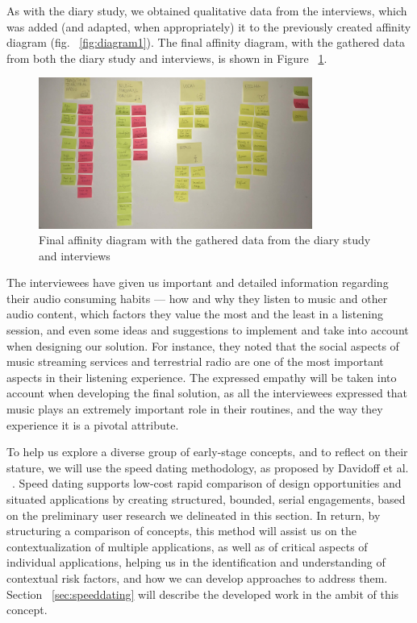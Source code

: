 As with the diary study, we obtained qualitative data from the interviews, which was added (and adapted, when appropriately) it to the previously created affinity diagram (fig. ~\ref{fig:diagram1}). The final affinity diagram, with the gathered data from both the diary study and interviews, is shown in Figure ~\ref{fig:diagram2}.

\begin{figure}[h]
\centering
\includegraphics[width=0.8\textwidth]{./Images/finalaffinitydiagram.jpg}
\caption{Final affinity diagram with the gathered data from the diary study and interviews}
\label{fig:diagram2}
\end{figure}

The interviewees have given us important and detailed information regarding their audio consuming habits — how and why they listen to music and other audio content, which factors they value the most and the least in a listening session, and even some ideas and suggestions to implement and take into account when designing our solution. For instance, they noted that the social aspects of music streaming services and terrestrial radio are one of the most important aspects in their listening experience. The expressed empathy will be taken into account when developing the final solution, as all the interviewees expressed that music plays an extremely important role in their routines, and the way they experience it is a pivotal attribute.

To help us explore a diverse group of early-stage concepts, and to reflect on their stature, we will use the speed dating methodology, as proposed by Davidoff et al. ~\cite{Davidoff2007}. Speed dating supports low-cost rapid comparison of design opportunities and situated applications by creating structured, bounded, serial engagements, based on the preliminary user research we delineated in this section. In return, by structuring a comparison of concepts, this method will assist us on the contextualization of multiple applications, as well as of critical aspects of individual applications, helping us in the identification and understanding of contextual risk factors, and how we can develop approaches to address them. Section ~\ref{sec:speeddating} will describe the developed work in the ambit of this concept.